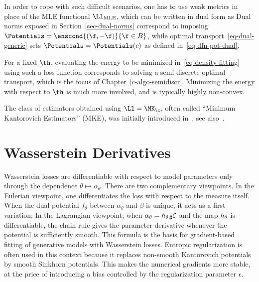 In order to cope with such difficult scenarios, one has to use weak metrics in place of the MLE functional $\Ll_{\text{MLE}}$, which can be written in dual form as
Dual norms exposed in Section~\ref{sec-dual-norms} correspond to imposing $\Potentials = \enscond{(\f,-\f)}{\f \in B}$, while optimal transport~\eqref{eq-dual-generic} sets $\Potentials = \Potentials(c)$ as defined in~\eqref{eq-dfn-pot-dual}.

For a fixed $\th$, evaluating the energy to be minimized in~\eqref{eq-density-fitting} using such a loss function corresponds to solving a semi-discrete optimal transport, which is the focus of Chapter~\ref{c-algo-semidiscr}. Minimizing the energy with respect to $\th$ is much more involved, and is typically highly non-convex.

The class of estimators obtained using $\Ll=\MK_\c$, often called ``Minimum Kantorovich Estimators'' (MKE), was initially introduced in~\cite{bassetti2006minimum}, see also~\cite{CanasRosasco}.


\section{Wasserstein Derivatives}

Wasserstein losses are differentiable with respect to model parameters only through the dependence $\theta \mapsto \alpha_\theta$. There are two complementary viewpoints.
%
In the Eulerian viewpoint, one differentiates the loss with respect to the measure itself. When the dual potential $f_\theta$ between $\alpha_\theta$ and $\beta$ is unique, it acts as a first variation:
%
In the Lagrangian viewpoint, when $\alpha_\theta=h_{\theta,\sharp}\zeta$ and the map $h_\theta$ is differentiable, the chain rule gives the parameter derivative
whenever the potential is sufficiently smooth. This formula is the basis for gradient-based fitting of generative models with Wasserstein losses.
%
Entropic regularization is often used in this context because it replaces non-smooth Kantorovich potentials by smooth Sinkhorn potentials. This makes the numerical gradients more stable, at the price of introducing a bias controlled by the regularization parameter $\epsilon$.


